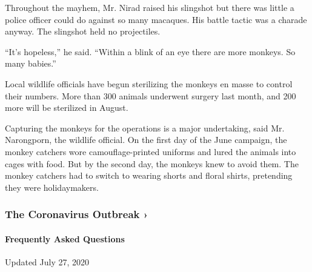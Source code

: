 Throughout the mayhem, Mr. Nirad raised his slingshot but there was
little a police officer could do against so many macaques. His battle
tactic was a charade anyway. The slingshot held no projectiles.

``It's hopeless,'' he said. ``Within a blink of an eye there are more
monkeys. So many babies.''

Local wildlife officials have begun sterilizing the monkeys en masse to
control their numbers. More than 300 animals underwent surgery last
month, and 200 more will be sterilized in August.

Capturing the monkeys for the operations is a major undertaking, said
Mr. Narongporn, the wildlife official. On the first day of the June
campaign, the monkey catchers wore camouflage-printed uniforms and lured
the animals into cages with food. But by the second day, the monkeys
knew to avoid them. The monkey catchers had to switch to wearing shorts
and floral shirts, pretending they were holidaymakers.

\href{https://www.nytimes.com/news-event/coronavirus?action=click\&pgtype=Article\&state=default\&region=MAIN_CONTENT_3\&context=storylines_faq}{}

\hypertarget{the-coronavirus-outbreak-}{%
\subsubsection{The Coronavirus Outbreak
›}\label{the-coronavirus-outbreak-}}

\hypertarget{frequently-asked-questions}{%
\paragraph{Frequently Asked
Questions}\label{frequently-asked-questions}}

Updated July 27, 2020

